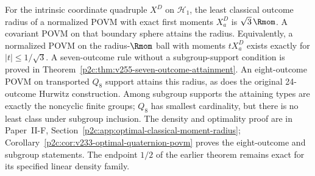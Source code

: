 \documentclass[12pt,a4paper]{article}
\begin{document}
\begin{theorem}
\label{p2c:thm:optimal-intrinsic-povm-radius}
For the intrinsic coordinate quadruple $X^D$ on $\mathcal H_1$, the least
classical outcome radius of a normalized POVM with exact first moments
$X_a^D$ is $\sqrt3\,\Rmom$. A covariant POVM on that boundary sphere attains
the radius. Equivalently, a normalized POVM on the radius-$\Rmom$ ball with
moments $tX_a^D$ exists exactly for $|t|\le1/\sqrt3$.
A seven-outcome rule without a subgroup-support condition is proved in
Theorem~\ref{p2c:thm:v255-seven-outcome-attainment}.
An eight-outcome POVM on transported \(Q_8\) support attains this
radius, as does the original 24-outcome Hurwitz construction.
Among subgroup supports the attaining types are exactly the noncyclic
finite groups; \(Q_8\) has smallest cardinality, but there is no least
class under subgroup inclusion. The density and optimality proof are in
Paper~II-F, Section~\ref{p2c:app:optimal-classical-moment-radius};
Corollary~\ref{p2c:cor:v233-optimal-quaternion-povm} proves the
eight-outcome and subgroup statements.
The endpoint $1/2$ of the earlier theorem remains exact for its specified
linear density family.
\end{theorem}
\end{document}
